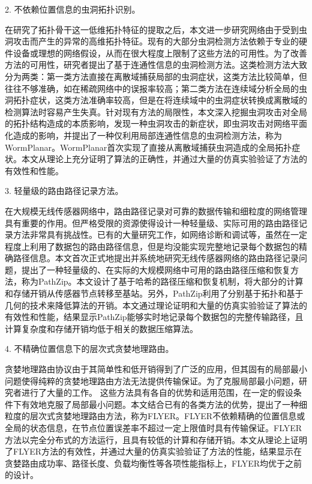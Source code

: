 2. 不依赖位置信息的虫洞拓扑识别。

在研究了拓扑骨干这一低维拓扑特征的提取之后，本文进一步研究网络由于受到虫洞攻击而产生的异常的高维拓扑特征。现有的大部分虫洞检测方法依赖于专业的硬件设备或理想的网络假设，从而在很大程度上限制了这些方法的可用性。为了改善方法的可用性，研究者提出了基于连通性信息的虫洞检测方法。这类检测方法大致分为两类：第一类方法直接在离散域捕获局部的虫洞症状，这类方法比较简单，但往往不够准确，如在稀疏网络中的误报率较高；第二类方法在连续域分析全局的虫洞拓扑症状，这类方法准确率较高，但是在将连续域中的虫洞症状转换成离散域的检测算法时容易产生失真。针对现有方法的局限性，本文深入挖掘虫洞攻击对全局的拓扑结构造成的本质影响，发现一种虫洞攻击的新症状，即虫洞攻击对网络平面化造成的影响，并提出了一种仅利用局部连通性信息的虫洞检测方法，称为WormPlanar。WormPlanar首次实现了直接从离散域捕获虫洞造成的全局拓扑症状。本文从理论上充分证明了算法的正确性，并通过大量的仿真实验验证了方法的有效性和性能。

3. 轻量级的路由路径记录方法。

在大规模无线传感器网络中，路由路径记录对可靠的数据传输和细粒度的网络管理具有重要的作用。但严格受限的资源使得设计一种轻量级、实际可用的路由路径记录方法非常具有挑战性。已有的大量研究工作，如网络诊断和调试等，虽然在一定程度上利用了数据包的路由路径信息，但是均没能实现完整地记录每个数据包的精确路径信息。本文首次正式地提出并系统地研究无线传感器网络的路由路径记录问题，提出了一种轻量级的、在实际的大规模网络中可用的路由路径压缩和恢复方法，称为PathZip。本文设计了基于哈希的路径压缩和恢复机制，将大部分的计算和存储开销从传感器节点转移至基站。另外，PathZip利用了分别基于拓扑和基于几何的技术来降低算法的开销。本文通过理论证明和大量的仿真实验验证了算法的有效性和性能，结果显示PathZip能够实时地记录每个数据包的完整传输路径，且计算复杂度和存储开销均低于相关的数据压缩算法。

4. 不精确位置信息下的层次式贪婪地理路由。

贪婪地理路由协议由于其简单性和低开销得到了广泛的应用，但其固有的局部最小问题使得纯粹的贪婪地理路由方法无法提供传输保证。为了克服局部最小问题，研究者进行了大量的工作。 这些方法具有各自的优势和适用范围，在一定的假设条件下有效地克服了局部最小问题。本文结合已有的各类方法的优势，提出了一种细粒度的层次式贪婪地理路由方法，称为FLYER。FLYER不依赖精确的位置信息或全局的状态信息，在节点位置误差率不超过一定上限值时具有传输保证。FLYER方法以完全分布式的方法运行，且具有较低的计算和存储开销。本文从理论上证明了FLYER方法的有效性，并通过大量的仿真实验验证了方法的性能，结果显示在贪婪路由成功率、路径长度、负载均衡性等各项性能指标上，FLYER均优于之前的设计。
